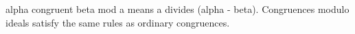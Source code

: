 alpha congruent beta mod a means a divides (alpha - beta). Congruences modulo ideals satisfy the same rules as ordinary congruences.
